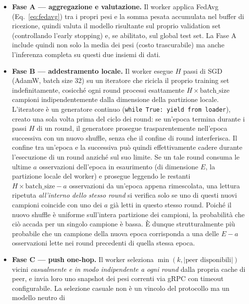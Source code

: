 \begin{itemize}
  \item \textbf{Fase A — aggregazione e valutazione.} Il worker applica
        FedAvg (Eq.~\ref{eq:fedavg}) tra i propri pesi e la somma pesata
        accumulata nel buffer di ricezione, quindi valuta il modello risultante
        sul proprio validation set (controllando l'early stopping) e, se abilitato, sul global test set. La
        Fase A include quindi non solo la media dei pesi (costo trascurabile)
        ma anche l'inferenza completa su questi due insiemi di dati.
  \item \textbf{Fase B — addestramento locale.} Il worker esegue $H$ passi di
        SGD (AdamW, batch size 32) su un iteratore che ricicla il proprio
        training set indefinitamente, cosicché ogni round processi esattamente
        $H \times \text{batch\_size}$ campioni indipendentemente dalla
        dimensione della partizione locale. L'iteratore è un generatore
        continuo (\texttt{while True: yield from loader}), creato una sola
        volta prima del ciclo dei round: se
        un'epoca termina durante
        i passi $H$ di un round, il generatore prosegue trasparentemente
        nell'epoca successiva con un nuovo shuffle, senza che il confine di
        round interferisca. Il confine tra un'epoca e la successiva può quindi effettivamente cadere
        durante l'esecuzione di un round anziché sul suo limite. Se un
        tale round consuma le ultime $a$ osservazioni dell'epoca in esaurimento
        (di dimensione $E$, la partizione locale del worker) e prosegue leggendo le restanti
        $H\times\text{batch\_size} - a$ osservazioni da un'epoca appena rimescolata,
        una lettura ripetuta \emph{all'interno dello stesso
        round} si verifica solo se uno di questi nuovi campioni coincide con uno dei
        $a$ già letti in questo stesso round. Poiché il nuovo shuffle è uniforme
        sull'intera partizione dei campioni, la probabilità che ciò accada per un
        singolo campione è bassa. È dunque strutturalmente
        più probabile che un campione della nuova epoca corrisponda a una delle
        $E-a$ osservazioni lette nei round precedenti di quella stessa epoca.
  \item \textbf{Fase C — push one-hop.} Il worker seleziona $\min(k,
        |\text{peer disponibili}|)$ vicini \emph{casualmente e in modo
        indipendente a ogni round} dalla propria cache di peer, e invia loro uno snapshot
        dei pesi correnti via gRPC con timeout configurabile. La selezione
        casuale non è un vincolo del protocollo ma un modello neutro di

\end{itemize}
